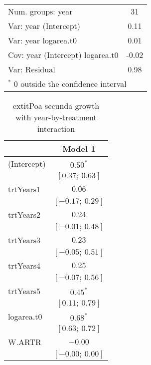 \begin{table}
\begin{center}
\begin{tabular}{l c }
Num. groups: year                & 31                \\
Var: year (Intercept)            & 0.11              \\
Var: year logarea.t0             & 0.01              \\
Cov: year (Intercept) logarea.t0 & -0.02             \\
Var: Residual                    & 0.98              \\
\hline
\multicolumn{2}{l}{\scriptsize{$^*$ 0 outside the confidence interval}}
\end{tabular}
\label{table:POSEgrowth-inARTR}
\end{center}
\end{table}


\begin{table}
\caption{	extit{Poa secunda} growth with year-by-treatment interaction}
\begin{center}
\begin{tabular}{l c }
\hline
 & Model 1 \\
\hline
(Intercept)                      & $0.50^{*}$        \\
                                 & $[0.37;\ 0.63]$   \\
trtYears1                        & $0.06$            \\
                                 & $[-0.17;\ 0.29]$  \\
trtYears2                        & $0.24$            \\
                                 & $[-0.01;\ 0.48]$  \\
trtYears3                        & $0.23$            \\
                                 & $[-0.05;\ 0.51]$  \\
trtYears4                        & $0.25$            \\
                                 & $[-0.07;\ 0.56]$  \\
trtYears5                        & $0.45^{*}$        \\
                                 & $[0.11;\ 0.79]$   \\
logarea.t0                       & $0.68^{*}$        \\
                                 & $[0.63;\ 0.72]$   \\
W.ARTR                           & $-0.00$           \\
                                 & $[-0.00;\ 0.00]$  \\

\end{tabular}
\end{center}
\end{table}
